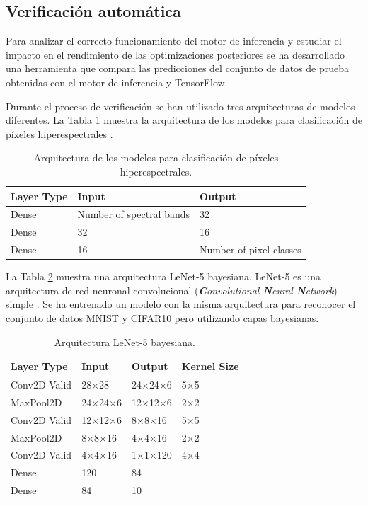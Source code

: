 \subsection{Verificación automática}

Para analizar el correcto funcionamiento del motor de inferencia y estudiar el impacto en el rendimiento de las optimizaciones posteriores se ha desarrollado una herramienta que compara las predicciones del conjunto de datos de prueba obtenidas con el motor de inferencia y TensorFlow.

Durante el proceso de verificación se han utilizado tres arquitecturas de modelos diferentes. La Tabla \ref{tab:hyper_models} muestra la arquitectura de los modelos para clasificación de píxeles hiperespectrales \cite{bnn_hyper_uncertainty}.

\begin{table}[h]
    \centering
    \caption{Arquitectura de los modelos para clasificación de píxeles hiperespectrales.}
    \label{tab:hyper_models}
    \begin{tabular}{lll}
    \hline
         \textbf{Layer Type} & \textbf{Input} & \textbf{Output}\\ \hline
         Dense & Number of spectral bands & 32\\
         Dense & 32 & 16\\
         Dense & 16 & Number of pixel classes\\ \hline
    \end{tabular}
\end{table}

La Tabla \ref{tab:cnn_models} muestra una arquitectura LeNet-5 bayesiana. LeNet-5 es una arquitectura de red neuronal convolucional (\textit{\textbf{C}onvolutional \textbf{N}eural \textbf{N}etwork}) simple \cite{lenet}. Se ha entrenado un modelo con la misma arquitectura para reconocer el conjunto de datos MNIST y CIFAR10 pero utilizando capas bayesianas.

\begin{table}[h]
    \centering
    \caption{Arquitectura LeNet-5 bayesiana.}
    \label{tab:cnn_models}
    \begin{tabular}{llll}
        \hline
         \textbf{Layer Type} &  \textbf{Input} &  \textbf{Output} & \textbf{Kernel Size} \\ \hline
         Conv2D Valid & 28$\times$28 & 24$\times$24$\times$6 & 5$\times$5 \\
         MaxPool2D & 24$\times$24$\times$6 & 12$\times$12$\times$6 & 2$\times$2 \\
         Conv2D Valid & 12$\times$12$\times$6 & 8$\times$8$\times$16 & 5$\times$5 \\
         MaxPool2D & 8$\times$8$\times$16 & 4$\times$4$\times$16 & 2$\times$2 \\
         Conv2D Valid & 4$\times$4$\times$16 & 1$\times$1$\times$120 & 4$\times$4 \\
         Dense & 120 & 84 & \\
         Dense & 84 & 10 & \\ \hline
    \end{tabular}
\end{table}

